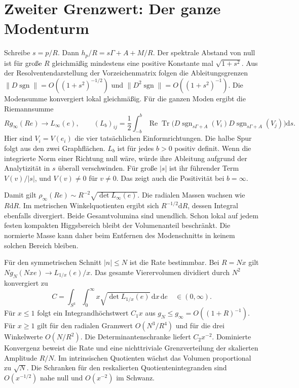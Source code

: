 \documentclass[11pt,a4paper]{article}
\newcommand{\sgn}{\operatorname{sgn}}
\newcommand{\dd}{\mathrm d}
\begin{document}
\section*{Zweiter Grenzwert: Der ganze Modenturm}
Schreibe $s=p/R$. Dann $h_p/R=s\Gamma+A+M/R$. Der spektrale Abstand von null ist für große $R$ gleichmäßig mindestens eine positive Konstante mal $\sqrt{1+s^2}$. Aus der Resolventendarstellung der Vorzeichenmatrix folgen die Ableitungsgrenzen $\|D\sgn\|=O((1+s^2)^{-1/2})$ und $\|D^2\sgn\|=O((1+s^2)^{-1})$. Die Modensumme konvergiert lokal gleichmäßig. Für die ganzen Moden ergibt die Riemannsumme
\[
 Rg_\infty(Re)\longrightarrow L_\infty(e),\qquad
 (L_b)_{ij}=\frac12\int_{-b}^{b}\!
 \operatorname{Re}\operatorname{Tr}
 \bigl(D\sgn_{s\Gamma+A}(V_i)D\sgn_{s\Gamma+A}(V_j)\bigr)\dd s .
\]
Hier sind $V_i=V(e_i)$ die vier tatsächlichen Einformrichtungen. Die halbe Spur folgt aus den zwei Graphflächen. $L_b$ ist für jedes $b>0$ positiv definit. Wenn die integrierte Norm einer Richtung null wäre, würde ihre Ableitung aufgrund der Analytizität in $s$ überall verschwinden. Für große $|s|$ ist ihr führender Term $V(v)/|s|$, und $V(v)\ne0$ für $v\ne0$. Das zeigt auch die Positivität bei $b=\infty$.

Damit gilt $\rho_\infty(Re)\sim R^{-2}\sqrt{\det L_\infty(e)}$. Die radialen Massen wachsen wie $R\dd R$. Im metrischen Winkelquotienten ergibt sich $R^{-1/2}\dd R$, dessen Integral ebenfalls divergiert. Beide Gesamtvolumina sind unendlich. Schon lokal auf jedem festen kompakten Higgsbereich bleibt der Volumenanteil beschränkt. Die normierte Masse kann daher beim Entfernen des Modenschnitts in keinem solchen Bereich bleiben.

Für den symmetrischen Schnitt $|n|\le N$ ist die Rate bestimmbar. Bei $R=Nx$ gilt $Ng_N(Nxe)\to L_{1/x}(e)/x$. Das gesamte Vierervolumen dividiert durch $N^2$ konvergiert zu
\[
 C=\int_{S^3}\int_0^\infty x\sqrt{\det L_{1/x}(e)}\,\dd x\,\dd e\quad\in(0,\infty).
\]
Für $x\le1$ folgt ein Integrandhöchstwert $C_1x$ aus $g_N\le g_\infty=O((1+R)^{-1})$. Für $x\ge1$ gilt für den radialen Gramwert $O(N^3/R^4)$ und für die drei Winkelwerte $O(N/R^2)$. Die Determinantenschranke liefert $C_2x^{-2}$. Dominierte Konvergenz beweist die Rate und eine nichttriviale Grenzverteilung der skalierten Amplitude $R/N$. Im intrinsischen Quotienten wächst das Volumen proportional zu $\sqrt N$. Die Schranken für den reskalierten Quotientenintegranden sind $O(x^{-1/2})$ nahe null und $O(x^{-2})$ im Schwanz.

\clearpage
\end{document}
